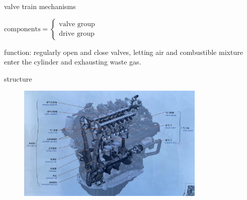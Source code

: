 \begin{frame}
	\begin{block}{valve train mechanisms}
		\begin{compactitem}
			\item
				$
				\text{components} = \begin{cases}
					\text{valve group} \\
					\text{drive group}
				\end{cases}
				$
			\item function: regularly open and close valves, letting air and combustible mixture enter the cylinder and exhausting waste gas.
		\end{compactitem}
	\end{block}
\end{frame}
\begin{frame}
	\begin{block}{}
		\begin{compactitem}
			\item structure
				\begin{figure}[htbp]
					\centering
					\includegraphics[width=0.8\textwidth]{2-6}
				\end{figure}
		\end{compactitem}
	\end{block}
\end{frame}
